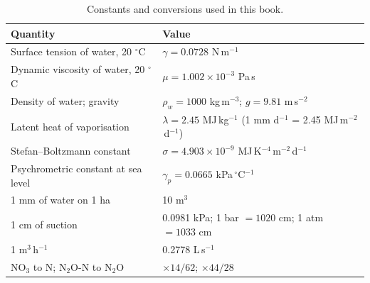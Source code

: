 \begin{table}[!htbp]\centering\small\caption{Constants and conversions used in this book.}\label{tab:ws-const}
\begin{tabular}{ll}\toprule
Quantity & Value\\\midrule
Surface tension of water, 20 $^\circ$C & $\gamma=0.0728$ N\,m$^{-1}$\\
Dynamic viscosity of water, 20 $^\circ$C & $\mu=1.002\times10^{-3}$ Pa\,s\\
Density of water; gravity & $\rho_w=1000$ kg\,m$^{-3}$; $g=9.81$ m\,s$^{-2}$\\
Latent heat of vaporisation & $\lambda=2.45$ MJ\,kg$^{-1}$ (1 mm d$^{-1}$ = 2.45 MJ\,m$^{-2}$\,d$^{-1}$)\\
Stefan--Boltzmann constant & $\sigma=4.903\times10^{-9}$ MJ\,K$^{-4}$\,m$^{-2}$\,d$^{-1}$\\
Psychrometric constant at sea level & $\gamma_p=0.0665$ kPa\,$^\circ$C$^{-1}$\\
1 mm of water on 1 ha & 10 m$^3$\\
1 cm of suction & 0.0981 kPa; 1 bar $=1020$ cm; 1 atm $=1033$ cm\\
1 m$^3$\,h$^{-1}$ & 0.2778 L\,s$^{-1}$\\
NO$_3$ to N; N$_2$O-N to N$_2$O & $\times14/62$; $\times44/28$\\
\bottomrule\end{tabular}\end{table}
